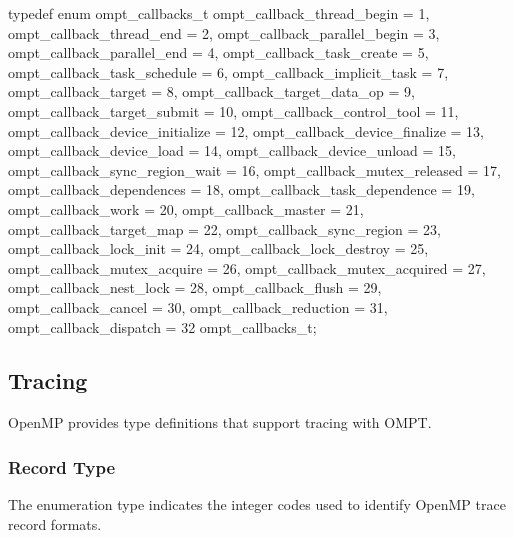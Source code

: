 \format
\begin{ccppspecific}
\begin{omptEnum}
typedef enum ompt_callbacks_t {
  ompt_callback_thread_begin             = 1,
  ompt_callback_thread_end               = 2,
  ompt_callback_parallel_begin           = 3,
  ompt_callback_parallel_end             = 4,
  ompt_callback_task_create              = 5,
  ompt_callback_task_schedule            = 6,
  ompt_callback_implicit_task            = 7,
  ompt_callback_target                   = 8,
  ompt_callback_target_data_op           = 9,
  ompt_callback_target_submit            = 10,
  ompt_callback_control_tool             = 11,
  ompt_callback_device_initialize        = 12,
  ompt_callback_device_finalize          = 13,
  ompt_callback_device_load              = 14,
  ompt_callback_device_unload            = 15,
  ompt_callback_sync_region_wait         = 16,
  ompt_callback_mutex_released           = 17,
  ompt_callback_dependences              = 18,
  ompt_callback_task_dependence          = 19,
  ompt_callback_work                     = 20,
  ompt_callback_master                   = 21,
  ompt_callback_target_map               = 22,
  ompt_callback_sync_region              = 23,
  ompt_callback_lock_init                = 24,
  ompt_callback_lock_destroy             = 25,
  ompt_callback_mutex_acquire            = 26,
  ompt_callback_mutex_acquired           = 27,
  ompt_callback_nest_lock                = 28,
  ompt_callback_flush                    = 29,
  ompt_callback_cancel                   = 30,
  ompt_callback_reduction                = 31,
  ompt_callback_dispatch                 = 32
} ompt_callbacks_t;
\end{omptEnum}
\end{ccppspecific}



\subsection{Tracing}
\label{sec:ompt_tracing}

OpenMP provides type definitions that support tracing with OMPT.

\subsubsection{Record Type}
\label{sec:ompt_record_t}

\summary
The  enumeration type indicates the integer codes 
used to identify OpenMP trace record formats.

